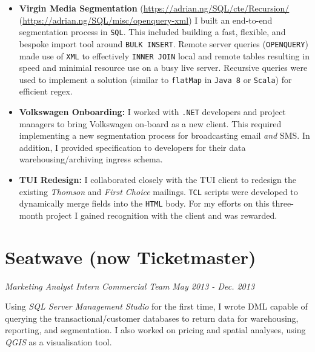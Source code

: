 \documentclass[letterpaper,11pt]{article}
\begin{document}
\begin{itemize}
	\item
	      {
	      \textbf{Virgin Media Segmentation}
	      \hfill
	      \tiny
	      (\href{https://adrian.ng/SQL/cte/Recursion/}{https://adrian.ng/SQL/cte/Recursion/}
	      \quad
	      (\href{https://adrian.ng/SQL/misc/openquery-xml}{https://adrian.ng/SQL/misc/openquery-xml})
	      \newline
	      \small
	      I built an end-to-end segmentation process in \texttt{SQL}. This included building a fast, flexible, and bespoke import tool around \texttt{BULK INSERT}. Remote server queries (\texttt{OPENQUERY}) made use of \texttt{XML} to effectively \texttt{INNER JOIN} local and remote tables resulting in speed and minimial resource use on a busy live server. Recursive queries were used to implement a solution (similar to \texttt{flatMap} in \texttt{Java 8} or \texttt{Scala}) for efficient regex.
	      }
	\item
	      {
	      \textbf{Volkswagen Onboarding:}
	      I worked with \texttt{.NET} developers and project managers to bring Volkswagen on-board as a new client. This required implementing a new segmentation process for broadcasting email \textit{and} SMS. In addition, I provided specification to developers for their data warehousing/archiving ingress schema.
	      }
	\item
	      {
	      \textbf{TUI Redesign:}
	      I collaborated closely with the TUI client to redesign the existing \textit{Thomson} and \textit{First Choice} mailings. \texttt{TCL} scripts were developed to dynamically merge fields into the \texttt{HTML} body.  For my efforts on this three-month project I gained recognition with the client and was rewarded.
	      }
\end{itemize}
\section{Seatwave (now Ticketmaster)}
\textit{Marketing Analyst Intern}
\hfill
\textit{Commercial Team}
\hfill
\textit{May 2013 - Dec. 2013\\}

\noindent
Using \textit{SQL Server Management Studio} for the first time, I wrote DML capable of querying the transactional/customer databases to return data for warehousing, reporting, and segmentation. I also worked on pricing and spatial analyses, using \textit{QGIS} as a visualisation tool.
\end{document}

